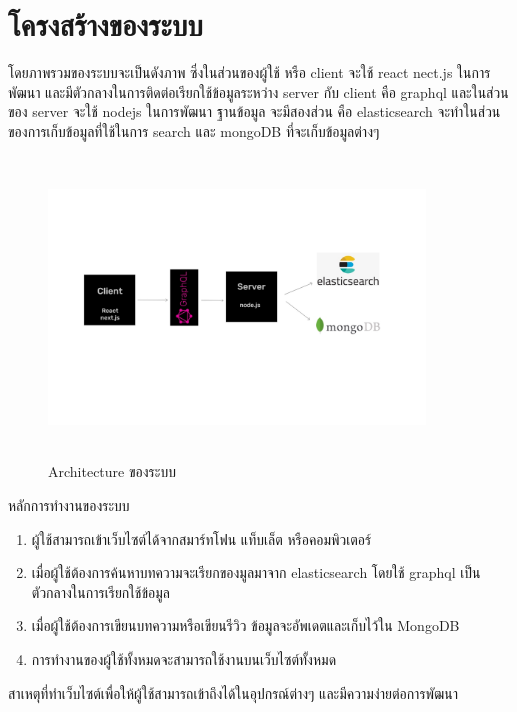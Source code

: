  \section{โครงสร้างของระบบ}
 โดยภาพรวมของระบบจะเป็นดังภาพ ซึ่งในส่วนของผู้ใช้ หรือ client จะใช้ react nect.js ในการพัฒนา และมีตัวกลางในการติดต่อเรียกใช้ข้อมูลระหว่าง server กับ client คือ graphql และในส่วนของ server จะใช้ nodejs ในการพัฒนา ฐานข้อมูล จะมีสองส่วน คือ elasticsearch จะทำในส่วนของการเก็บข้อมูลที่ใช้ในการ search และ mongoDB ที่จะเก็บข้อมูลต่างๆ
\begin{figure}[h]
\begin{center}
\includegraphics[width=10cm, height=8cm]{database.jpg}
\end{center}
\caption[Poem]{Architecture ของระบบ}
\end{figure}
หลักการทำงานของระบบ
\begin{enumerate}
  \item ผู้ใช้สามารถเข้าเว็บไซต์ได้จากสมาร์ทโฟน แท็บเล็ต หรือคอมพิวเตอร์
  \item เมื่อผู้ใช้ต้องการค้นหาบทความจะเรียกของมูลมาจาก elasticsearch โดยใช้ graphql เป็นตัวกลางในการเรียกใช้ข้อมูล
  \item เมื่อผู้ใช้ต้องการเขียนบทความหรือเขียนรีวิว ข้อมูลจะอัพเดตและเก็บไว้ใน MongoDB 
  \item การทำงานของผู้ใช้ทั้งหมดจะสามารถใช้งานบนเว็บไซต์ทั้งหมด
\end{enumerate}
สาเหตุที่ทำเว็บไซต์เพื่อให้ผู้ใช้สามารถเข้าถึงได้ในอุปกรณ์ต่างๆ และมีความง่ายต่อการพัฒนา
